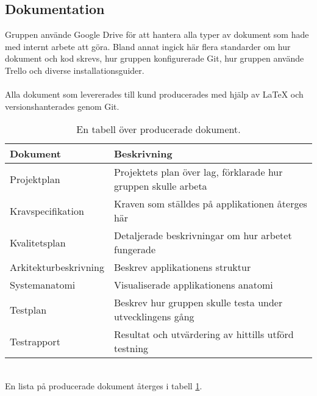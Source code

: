 \subsection{Dokumentation}
Gruppen använde Google Drive för att hantera alla typer av dokument som hade med internt arbete att göra. Bland annat ingick här flera standarder om hur dokument och kod skrevs, hur gruppen konfigurerade Git, hur gruppen använde Trello och diverse installationsguider.
\\ \\
Alla dokument som levererades till kund producerades med hjälp av LaTeX och versionshanterades genom Git.

\begin{table}[h!]
  \centering
  \caption{En tabell över producerade dokument.}
  \def\arraystretch{1.5}
  \begin{adjustbox}{max width=\textwidth}
    \begin{tabularx}{\textwidth}{ | l | X | }
      \hline
      \textbf{Dokument} & \textbf{Beskrivning} \\
      \hline
      Projektplan & Projektets plan över lag, förklarade hur gruppen skulle arbeta \\
      \hline
      Kravspecifikation & Kraven som ställdes på applikationen återges här \\
      \hline
      Kvalitetsplan & Detaljerade beskrivningar om hur arbetet fungerade \\
      \hline
      Arkitekturbeskrivning & Beskrev applikationens struktur \\
      \hline
      Systemanatomi & Visualiserade applikationens anatomi \\
      \hline
      Testplan & Beskrev hur gruppen skulle testa under utvecklingens gång \\
      \hline
      Testrapport & Resultat och utvärdering av hittills utförd testning \\
      \hline
    \end{tabularx}
  \end{adjustbox}
  \label{tab:produced_documents}
\end{table}
\ \\
En lista på producerade dokument återges i tabell \ref{tab:produced_documents}.

